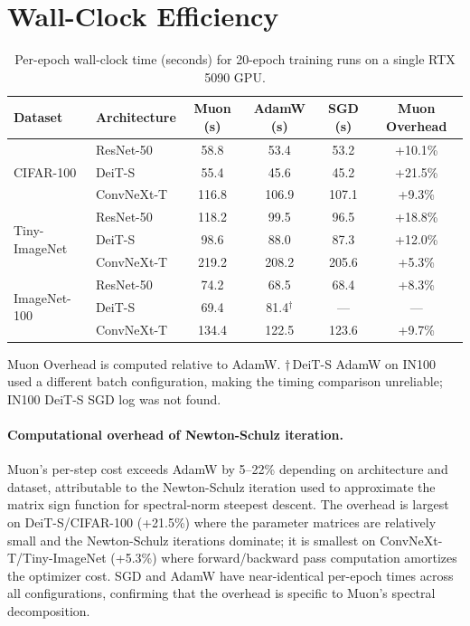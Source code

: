 \section{Wall-Clock Efficiency}\label{sec:wallclock}

\begin{table}[h]
\centering
\caption{Per-epoch wall-clock time (seconds) for 20-epoch training runs on a single RTX 5090 GPU.}
\label{tab:wallclock}
\small
\begin{tabular}{llcccc}
\toprule
Dataset & Architecture & Muon (s) & AdamW (s) & SGD (s) & Muon Overhead \\
\midrule
\multirow{3}{*}{CIFAR-100}
 & ResNet-50  & 58.8  & 53.4  & 53.2  & +10.1\% \\
 & DeiT-S     & 55.4  & 45.6  & 45.2  & +21.5\% \\
 & ConvNeXt-T & 116.8 & 106.9 & 107.1 & +9.3\%  \\
\midrule
\multirow{3}{*}{Tiny-ImageNet}
 & ResNet-50  & 118.2 & 99.5  & 96.5  & +18.8\% \\
 & DeiT-S     & 98.6  & 88.0  & 87.3  & +12.0\% \\
 & ConvNeXt-T & 219.2 & 208.2 & 205.6 & +5.3\%  \\
\midrule
\multirow{3}{*}{ImageNet-100}
 & ResNet-50  & 74.2  & 68.5  & 68.4  & +8.3\%  \\
 & DeiT-S     & 69.4  & 81.4$^\dagger$  & ---   & ---     \\
 & ConvNeXt-T & 134.4 & 122.5 & 123.6 & +9.7\%  \\
\bottomrule
\end{tabular}
\vspace{0.3em}
\par\noindent\footnotesize{Muon Overhead is computed relative to AdamW. $\dagger$\,DeiT-S AdamW on IN100 used a different batch configuration, making the timing comparison unreliable; IN100 DeiT-S SGD log was not found.}
\end{table}

\paragraph{Computational overhead of Newton-Schulz iteration.}
Muon's per-step cost exceeds AdamW by 5--22\% depending on architecture and dataset, attributable to the Newton-Schulz iteration used to approximate the matrix sign function for spectral-norm steepest descent. The overhead is largest on DeiT-S/CIFAR-100 (+21.5\%) where the parameter matrices are relatively small and the Newton-Schulz iterations dominate; it is smallest on ConvNeXt-T/Tiny-ImageNet (+5.3\%) where forward/backward pass computation amortizes the optimizer cost. SGD and AdamW have near-identical per-epoch times across all configurations, confirming that the overhead is specific to Muon's spectral decomposition.

